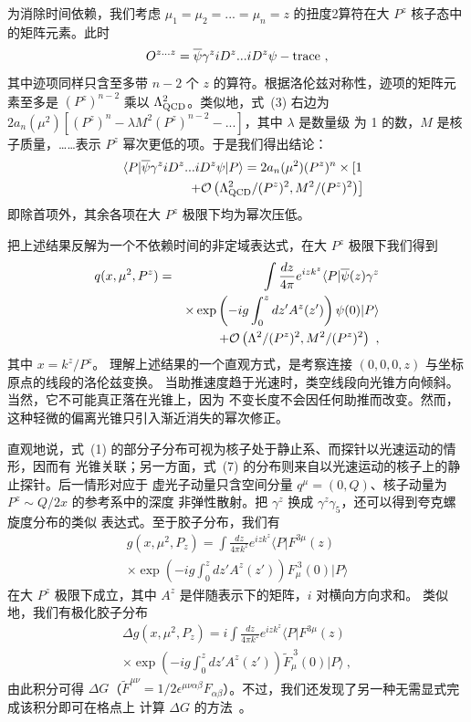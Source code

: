 为消除时间依赖，我们考虑 $\mu_1=\mu_2=...=\mu_n=z$ 的扭度2算符在大 $P^z$
核子态中的矩阵元素。此时
\begin{equation}
   O^{z...z} = {\overline \psi}\gamma^{z}iD^{z} ... iD^{z} \psi - {\rm trace} \ ,
\end{equation}
其中迹项同样只含至多带 $n-2$ 个 $z$ 的算符。根据洛伦兹对称性，迹项的矩阵元素至多是
$(P^z)^{n-2}$ 乘以 $\Lambda^2_{\rm QCD}$。类似地，式~(3) 右边为
$2a_n(\mu^2)\left[(P^z)^n-\lambda M^2(P^z)^{n-2}-...\right]$，其中 $\lambda$ 是数量级
为 1 的数，$M$ 是核子质量，……表示 $P^z$ 幂次更低的项。于是我们得出结论：
\begin{eqnarray}
     && \langle P| {\overline \psi}\gamma^{z}iD^{z} ... iD^{z} \psi|P\rangle
       = 2a_n(\mu^2) (P^z)^n\times \left[ 1 \right.\\ && \left.+ {\cal O}\left(\Lambda^2_{\rm QCD}/(P^z)^2,  M^2/(P^z)^2\right)\right] \nonumber
\end{eqnarray}
即除首项外，其余各项在大 $P^z$ 极限下均为幂次压低。

把上述结果反解为一个不依赖时间的非定域表达式，在大 $P^z$ 极限下我们得到
\begin{eqnarray}
   q(x,\mu^2, P^z) &=& \int \frac{dz}{4\pi} e^{izk^z}  \langle P|\overline{\psi}(z)
   \gamma^z \\
   && \times \exp\left(-ig\int^{z}_0 dz' A^z(z') \right)\psi(0) |P\rangle \nonumber
 \\ && + {\cal O}\left(\Lambda^2/(P^z)^2,  M^2/(P^z)^2\right) \ ,  \nonumber
\end{eqnarray}
其中 $x= k^z/P^z$。
理解上述结果的一个直观方式，是考察连接 $(0,0,0,z)$ 与坐标原点的线段的洛伦兹变换。
当助推速度趋于光速时，类空线段向光锥方向倾斜。当然，它不可能真正落在光锥上，因为
不变长度不会因任何助推而改变。然而，这种轻微的偏离光锥只引入渐近消失的幂次修正。

直观地说，式~(1) 的部分子分布可视为核子处于静止系、而探针以光速运动的情形，因而有
光锥关联；另一方面，式~(7) 的分布则来自以光速运动的核子上的静止探针。后一情形对应于
虚光子动量只含空间分量 $q^\mu = (0, Q)$、核子动量为 $P^z \sim Q/2x$ 的参考系中的深度
非弹性散射。把 $\gamma^z$ 换成 $\gamma^z\gamma_5$，还可以得到夸克螺旋度分布的类似
表达式。至于胶子分布，我们有
\begin{eqnarray}
g(x,\mu^2, P_z) = \int \frac{dz}{4\pi k^z}
e^{izk^z} \langle P|F^{3\mu}(z)  \\
\times \exp\left(-ig \int^z_0 dz' A^z(z')\right)
F^{~3}_\mu(0)|P\rangle \nonumber
\end{eqnarray}
在大 $P^z$ 极限下成立，其中 $A^z$ 是伴随表示下的矩阵，$i$ 对横向方向求和。
类似地，我们有极化胶子分布
\begin{eqnarray}
\Delta g(x,\mu^2, P_z) = i\int \frac{dz}{4\pi k^z}
e^{izk^z} \langle P|F^{3\mu}(z)  \\
\times \exp\left(-ig \int^z_0 dz' A^z(z')\right)
\tilde F^{~3}_\mu(0)|P\rangle \nonumber \ ,
\end{eqnarray}
由此积分可得 $\Delta G$（$\tilde F^{\mu\nu} = 1/2 \epsilon^{\mu\nu\alpha\beta}F_{\alpha\beta}$）。不过，我们还发现了另一种无需显式完成该积分即可在格点上
计算 $\Delta G$ 的方法~\cite{Ji:2013fga}。

